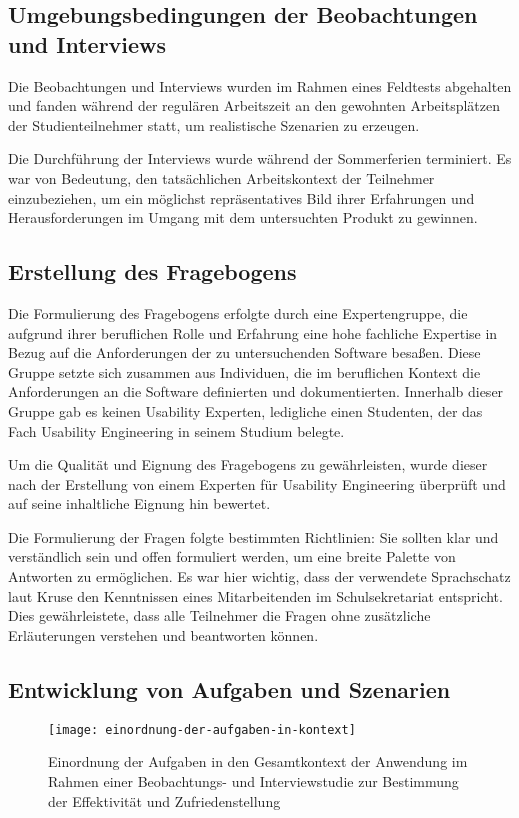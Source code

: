\subsection{Umgebungsbedingungen der Beobachtungen und Interviews}

Die Beobachtungen und Interviews wurden im Rahmen eines Feldtests abgehalten und fanden während der regulären Arbeitszeit an den gewohnten Arbeitsplätzen der Studienteilnehmer statt, um realistische Szenarien zu erzeugen. 

Die Durchführung der Interviews wurde während der Sommerferien terminiert. Es war von Bedeutung, den tatsächlichen Arbeitskontext der Teilnehmer einzubeziehen, um ein möglichst repräsentatives Bild ihrer Erfahrungen und Herausforderungen im Umgang mit dem untersuchten Produkt zu gewinnen.

\subsection{Erstellung des Fragebogens}

Die Formulierung des Fragebogens erfolgte durch eine Expertengruppe, die aufgrund ihrer beruflichen Rolle und Erfahrung eine hohe fachliche Expertise in Bezug auf die Anforderungen der zu untersuchenden Software besaßen. Diese Gruppe setzte sich zusammen aus Individuen, die im beruflichen Kontext die Anforderungen an die Software definierten und dokumentierten. Innerhalb dieser Gruppe gab es keinen Usability Experten, ledigliche einen Studenten, der das Fach \glqq Usability Engineering\grqq{} in seinem Studium belegte.

Um die Qualität und Eignung des Fragebogens zu gewährleisten, wurde dieser nach der Erstellung von einem Experten für Usability Engineering überprüft und auf seine inhaltliche Eignung hin bewertet.

Die Formulierung der Fragen folgte bestimmten Richtlinien: Sie sollten klar und verständlich sein und offen formuliert werden, um eine breite Palette von Antworten zu ermöglichen. Es war hier wichtig, dass der verwendete Sprachschatz laut Kruse den Kenntnissen eines Mitarbeitenden im Schulsekretariat entspricht.\cite{Kruse_2015} Dies gewährleistete, dass alle Teilnehmer die Fragen ohne zusätzliche Erläuterungen verstehen und beantworten können.

\subsection{Entwicklung von Aufgaben und Szenarien}
\begin{figure}[H]
    \caption{Einordnung der Aufgaben in den Gesamtkontext der Anwendung im Rahmen einer Beobachtungs- und Interviewstudie zur Bestimmung der Effektivität und Zufriedenstellung}
    \label{fig:EinordnungAufgaben}
    \texttt{[image: einordnung-der-aufgaben-in-kontext]}
\end{figure}

